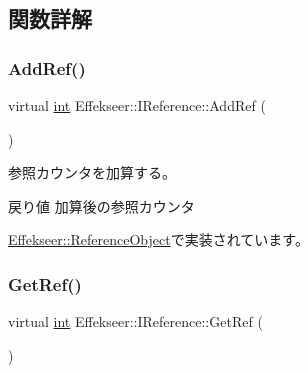 \subsection{関数詳解}
\mbox{\label{class_effekseer_1_1_i_reference_a3e3b54e8e5081e24f5784e4f9b8f6257}} 
\subsubsection{\texorpdfstring{Add\+Ref()}{AddRef()}}
{\footnotesize\ttfamily virtual \mbox{\hyperlink{namespace_effekseer_ace0abf7c2e6947e519ebe8b54cbcc30a}{int}} Effekseer\+::\+I\+Reference\+::\+Add\+Ref (\begin{DoxyParamCaption}{ }\end{DoxyParamCaption})\hspace{0.3cm}{\ttfamily [pure virtual]}}



参照カウンタを加算する。 

\begin{DoxyReturn}{戻り値}
加算後の参照カウンタ 
\end{DoxyReturn}


\mbox{\hyperlink{class_effekseer_1_1_reference_object_a1cc3feeee39b72aea152ed223dbd0fa7}{Effekseer\+::\+Reference\+Object}}で実装されています。

\mbox{\label{class_effekseer_1_1_i_reference_a95274c788c8c03d27a3e424facc728b6}} 
\subsubsection{\texorpdfstring{Get\+Ref()}{GetRef()}}
{\footnotesize\ttfamily virtual \mbox{\hyperlink{namespace_effekseer_ace0abf7c2e6947e519ebe8b54cbcc30a}{int}} Effekseer\+::\+I\+Reference\+::\+Get\+Ref (\begin{DoxyParamCaption}{ }\end{DoxyParamCaption})\hspace{0.3cm}{\ttfamily [pure virtual]}}



